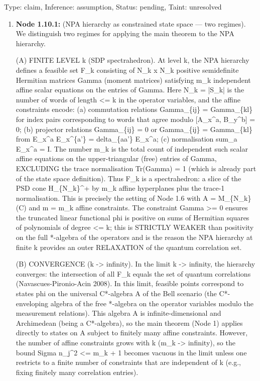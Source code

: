 \documentclass{article}
\begin{document}
\begin{enumerate}
  Type: claim, Inference: assumption, Status: pending, Taint: unresolved

\begin{enumerate}
\item \textbf{Node 1.10.1:} (NPA hierarchy as constrained state space — two regimes). We distinguish two regimes for applying the main theorem to the NPA hierarchy.

(A) FINITE LEVEL k (SDP spectrahedron). At level k, the NPA hierarchy defines a feasible set F\_k consisting of N\_k x N\_k positive semidefinite Hermitian matrices Gamma (moment matrices) satisfying m\_k independent affine scalar equations on the entries of Gamma. Here N\_k = |S\_k| is the number of words of length <= k in the operator variables, and the affine constraints encode: (a) commutation relations Gamma\_\{ij\} = Gamma\_\{kl\} for index pairs corresponding to words that agree modulo [A\_x\textasciicircum{}a, B\_y\textasciicircum{}b] = 0; (b) projector relations Gamma\_\{ij\} = 0 or Gamma\_\{ij\} = Gamma\_\{kl\} from E\_x\textasciicircum{}a E\_x\textasciicircum{}\{a'\} = delta\_\{aa'\} E\_x\textasciicircum{}a; (c) normalisation sum\_a E\_x\textasciicircum{}a = I. The number m\_k is the total count of independent such scalar affine equations on the upper-triangular (free) entries of Gamma, EXCLUDING the trace normalisation Tr(Gamma) = 1 (which is already part of the state space definition). Thus F\_k is a spectrahedron: a slice of the PSD cone H\_\{N\_k\}\textasciicircum{}+ by m\_k affine hyperplanes plus the trace-1 normalisation. This is precisely the setting of Node 1.6 with A = M\_\{N\_k\}(C) and m = m\_k affine constraints. The constraint Gamma >= 0 ensures the truncated linear functional phi is positive on sums of Hermitian squares of polynomials of degree <= k; this is STRICTLY WEAKER than positivity on the full *-algebra of the operators and is the reason the NPA hierarchy at finite k provides an outer RELAXATION of the quantum correlation set.

(B) CONVERGENCE (k -> infinity). In the limit k -> infinity, the hierarchy converges: the intersection of all F\_k equals the set of quantum correlations (Navascues-Pironio-Acin 2008). In this limit, feasible points correspond to states phi on the universal C*-algebra A of the Bell scenario (the C*-enveloping algebra of the free *-algebra on the operator variables modulo the measurement relations). This algebra A is infinite-dimensional and Archimedean (being a C*-algebra), so the main theorem (Node 1) applies directly to states on A subject to finitely many affine constraints. However, the number of affine constraints grows with k (m\_k -> infinity), so the bound Sigma n\_j\textasciicircum{}2 <= m\_k + 1 becomes vacuous in the limit unless one restricts to a finite number of constraints that are independent of k (e.g., fixing finitely many correlation entries).


\end{enumerate}
\end{enumerate}
\end{document}
